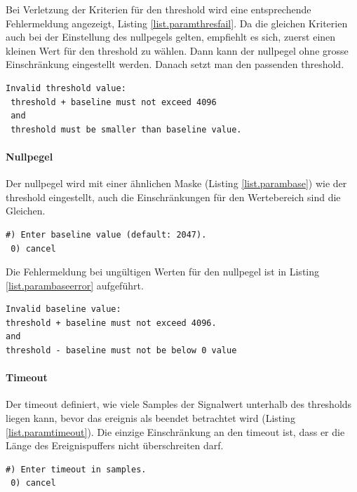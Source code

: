Bei Verletzung der Kriterien für den \gls{threshold} wird eine entsprechende Fehlermeldung angezeigt, Listing \ref{list.paramthresfail}. Da die gleichen Kriterien auch bei der Einstellung des \gls{nullpegel}s gelten, empfiehlt es sich, zuerst einen kleinen Wert für den \gls{threshold} zu wählen. Dann kann der \gls{nullpegel} ohne grosse Einschränkung eingestellt werden. Danach setzt man den passenden \gls{threshold}.

\begin{lstlisting}[caption=Fehlermeldung ungültiger Threshold, label=list.paramthresfail]
 Invalid threshold value:
 threshold + baseline must not exceed 4096
 and
 threshold must be smaller than baseline value.
\end{lstlisting}

\paragraph{Nullpegel} Der \gls{nullpegel} wird mit einer ähnlichen Maske (Listing \ref{list.parambase}) wie der \gls{threshold} eingestellt, auch die Einschränkungen für den Wertebereich sind die Gleichen.

\begin{lstlisting}[caption=Untermenü Null-Level, label=list.parambase]
 #) Enter baseline value (default: 2047).
 0) cancel
\end{lstlisting}

Die Fehlermeldung bei ungültigen Werten für den \gls{nullpegel} ist in Listing \ref{list.parambaseerror} aufgeführt.

\begin{lstlisting}[caption=Fehlermeldung ungültiger Nullpegel, label=list.parambaseerror]
Invalid baseline value:
threshold + baseline must not exceed 4096.
and
threshold - baseline must not be below 0 value
\end{lstlisting}

\paragraph{Timeout} Der \gls{timeout} definiert, wie viele Samples der Signalwert unterhalb des \gls{threshold}s liegen kann, bevor das \gls{ereignis} als beendet betrachtet wird (Listing \ref{list.paramtimeout}). Die einzige Einschränkung an den \gls{timeout} ist, dass er die Länge des Ereignispuffers nicht überschreiten darf.

\begin{lstlisting}[caption=Untermenü Timeout, label=list.paramtimeout]
 #) Enter timeout in samples.
 0) cancel
\end{lstlisting}

